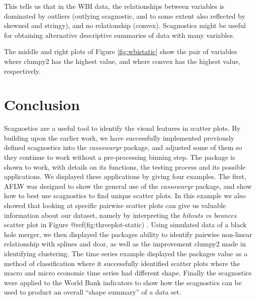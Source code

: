 This tells us that in the WBI data, the relationships between variables
is dominated by outliers (outlying scagnostic, and to some extent also
reflected by skewned and stringy), and no relationship (convex).
Scagnostics might be useful for obtaining alternative descriptive
summaries of data with many variables.

The middle and right plots of Figure \ref{fig:wbistatic} show the pair
of variables where clumpy2 has the highest value, and where convex has
the highest value, respectively.

\hypertarget{conclusion}{%
\section{Conclusion}\label{conclusion}}

Scagnostics are a useful tool to identify the visual features in scatter
plots. By building upon the earlier work, we have successfully
implemented previously defined scagnostics into the \emph{cassowaryr}
package, and adjusted some of them so they continue to work without a
pre-processing binning step. The package is shown to work, with details
on its functions, the testing process and its possible applications. We
displayed these applications by giving four examples. The first, AFLW
was designed to show the general use of the \emph{cassowaryr} package,
and show how to best use scagnostics to find unique scatter plots. In
this example we also showed that looking at specific pairwise scatter
plots can give us valuable information about our dataset, namely by
interpreting the \emph{hitouts vs bounces} scatter plot in Figure
@ref(fig:threeplot-static) . Using simulated data of a black hole
merger, we then displayed the packages ability to identify pairwise
non-linear relationship with splines and dcor, as well as the
improvement clumpy2 made in identifying clustering. The time series
example displayed the packages value as a method of classification where
it successfully identified scatter plots where the macro and micro
economic time series had different shape. Finally the scagnostics were
applied to the World Bank indicators to show how the scagnostics can be
used to product an overall ``shape summary'' of a data set.

